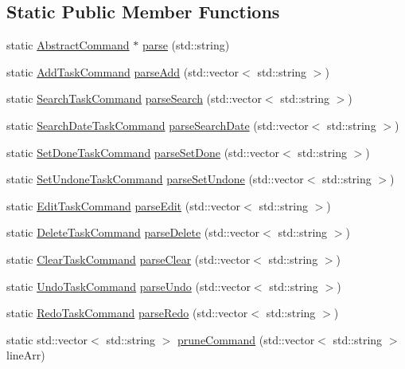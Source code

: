 \subsection*{Static Public Member Functions}
\begin{DoxyCompactItemize}
\item 
static \hyperlink{class_do_lah_1_1_abstract_command}{Abstract\+Command} $\ast$ \hyperlink{class_do_lah_1_1_command_parser_a54a1833a135fc33b171da5eafd3f72d3}{parse} (std\+::string)
\item 
static \hyperlink{class_do_lah_1_1_add_task_command}{Add\+Task\+Command} \hyperlink{class_do_lah_1_1_command_parser_acfdbc9b74dfe712260d665a732f9d4e7}{parse\+Add} (std\+::vector$<$ std\+::string $>$)
\item 
static \hyperlink{class_do_lah_1_1_search_task_command}{Search\+Task\+Command} \hyperlink{class_do_lah_1_1_command_parser_a881728dc43f96e993683284fa59df8de}{parse\+Search} (std\+::vector$<$ std\+::string $>$)
\item 
static \hyperlink{class_do_lah_1_1_search_date_task_command}{Search\+Date\+Task\+Command} \hyperlink{class_do_lah_1_1_command_parser_a0f0fe6d2e04d1690e8a288b7c439e1ff}{parse\+Search\+Date} (std\+::vector$<$ std\+::string $>$)
\item 
static \hyperlink{class_do_lah_1_1_set_done_task_command}{Set\+Done\+Task\+Command} \hyperlink{class_do_lah_1_1_command_parser_a393c222301fde27837a9c8252826cd97}{parse\+Set\+Done} (std\+::vector$<$ std\+::string $>$)
\item 
static \hyperlink{class_do_lah_1_1_set_undone_task_command}{Set\+Undone\+Task\+Command} \hyperlink{class_do_lah_1_1_command_parser_a349996bca3ad2cace57e1ecd6fa0bad9}{parse\+Set\+Undone} (std\+::vector$<$ std\+::string $>$)
\item 
static \hyperlink{class_do_lah_1_1_edit_task_command}{Edit\+Task\+Command} \hyperlink{class_do_lah_1_1_command_parser_a83c6517b2dc69d6b53fc020002ef4afd}{parse\+Edit} (std\+::vector$<$ std\+::string $>$)
\item 
static \hyperlink{class_do_lah_1_1_delete_task_command}{Delete\+Task\+Command} \hyperlink{class_do_lah_1_1_command_parser_aad78c1d4e5a959591722f56f702ced83}{parse\+Delete} (std\+::vector$<$ std\+::string $>$)
\item 
static \hyperlink{class_do_lah_1_1_clear_task_command}{Clear\+Task\+Command} \hyperlink{class_do_lah_1_1_command_parser_af01027268ff51142bcba498980b2012b}{parse\+Clear} (std\+::vector$<$ std\+::string $>$)
\item 
static \hyperlink{class_do_lah_1_1_undo_task_command}{Undo\+Task\+Command} \hyperlink{class_do_lah_1_1_command_parser_a7bd5ba4fb0e8d0fe8d25eeac00916227}{parse\+Undo} (std\+::vector$<$ std\+::string $>$)
\item 
static \hyperlink{class_do_lah_1_1_redo_task_command}{Redo\+Task\+Command} \hyperlink{class_do_lah_1_1_command_parser_aec60480f7475b7e3c0a2b264baf64adc}{parse\+Redo} (std\+::vector$<$ std\+::string $>$)
\item 
static std\+::vector$<$ std\+::string $>$ \hyperlink{class_do_lah_1_1_command_parser_a3533bc26c47acd5c7b41f2ac2d080c09}{prune\+Command} (std\+::vector$<$ std\+::string $>$ line\+Arr)
\end{DoxyCompactItemize}
